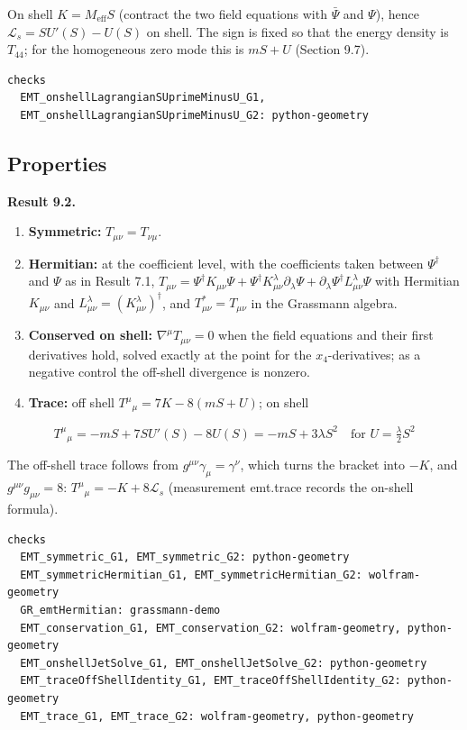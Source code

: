 \documentclass[11pt]{article}
\begin{document}
On shell $K=M_{\mathrm{eff}}S$ (contract the two field equations with $\bar\Psi$ and $\Psi$), hence $\mathcal L_s=SU'(S)-U(S)$ on shell. The sign is fixed so that the energy density is $T_{44}$; for the homogeneous zero mode this is $mS+U$ (Section 9.7).

\begin{Verbatim}[fontsize=\small]
checks
  EMT_onshellLagrangianSUprimeMinusU_G1,
  EMT_onshellLagrangianSUprimeMinusU_G2: python-geometry
\end{Verbatim}

\subsection{Properties}

\textbf{Result 9.2.}

\begin{enumerate}
\item \textbf{Symmetric:} $T_{\mu\nu}=T_{\nu\mu}$.
\item \textbf{Hermitian:} at the coefficient level, with the coefficients taken between $\Psi^\dagger$ and $\Psi$ as in Result 7.1, $T_{\mu\nu}=\Psi^\dagger K_{\mu\nu}\Psi+\Psi^\dagger K^\lambda_{\mu\nu}\partial_\lambda\Psi+\partial_\lambda\Psi^\dagger L^\lambda_{\mu\nu}\Psi$ with Hermitian $K_{\mu\nu}$ and $L^\lambda_{\mu\nu}=(K^\lambda_{\mu\nu})^\dagger$, and $T_{\mu\nu}^\ast=T_{\mu\nu}$ in the Grassmann algebra.
\item \textbf{Conserved on shell:} $\nabla^\mu T_{\mu\nu}=0$ when the field equations and their first derivatives hold, solved exactly at the point for the $x_4$-derivatives; as a negative control the off-shell divergence is nonzero.
\item \textbf{Trace:} off shell $T^\mu{}_\mu=7K-8(mS+U)$; on shell
\end{enumerate}

\[
T^\mu{}_\mu=-mS+7SU'(S)-8U(S)=-mS+3\lambda S^2\quad\text{for }U=\tfrac\lambda2S^2
\]

The off-shell trace follows from $g^{\mu\nu}\gamma_\mu=\gamma^\nu$, which turns the bracket into $-K$, and $g^{\mu\nu}g_{\mu\nu}=8$: $T^\mu{}_\mu=-K+8\mathcal L_s$ (measurement emt.trace records the on-shell formula).

\begin{Verbatim}[fontsize=\small]
checks
  EMT_symmetric_G1, EMT_symmetric_G2: python-geometry
  EMT_symmetricHermitian_G1, EMT_symmetricHermitian_G2: wolfram-geometry
  GR_emtHermitian: grassmann-demo
  EMT_conservation_G1, EMT_conservation_G2: wolfram-geometry, python-geometry
  EMT_onshellJetSolve_G1, EMT_onshellJetSolve_G2: python-geometry
  EMT_traceOffShellIdentity_G1, EMT_traceOffShellIdentity_G2: python-geometry
  EMT_trace_G1, EMT_trace_G2: wolfram-geometry, python-geometry
\end{Verbatim}
\end{document}

